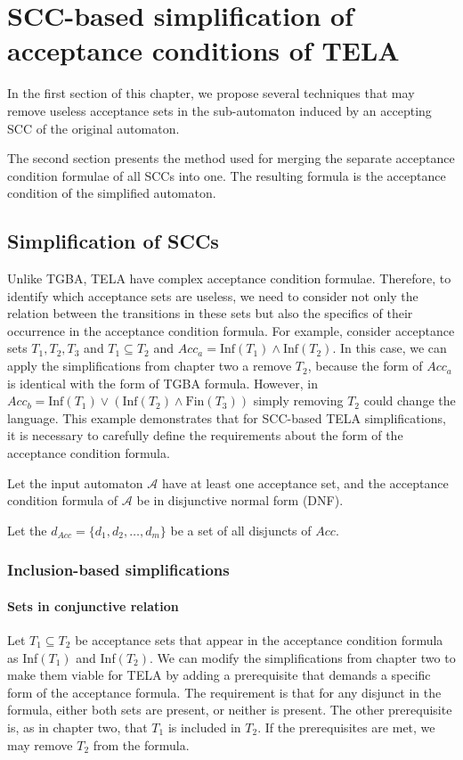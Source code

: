\documentclass[
  digital, %
  twoside, %
  table,   %
  lof,     %
  lot,     %
]{fithesis3}
\begin{document}
\chapter{SCC-based simplification of acceptance conditions of TELA}
In the first section of this chapter, we propose several techniques that may remove useless acceptance sets in the sub-automaton induced by an accepting SCC of the original automaton. 

The second section presents the method used for merging the separate acceptance condition formulae of all SCCs into one. The resulting formula is the acceptance condition of the simplified automaton.

\section{Simplification of SCCs}
Unlike TGBA, TELA have complex acceptance condition formulae. Therefore, to identify which acceptance sets are useless, we need to consider not only the relation between the transitions in these sets but also the specifics of their occurrence in the acceptance condition formula. For example, consider acceptance sets $T_1, T_2, T_3$ and $T_1 \subseteq T_2$ and $Acc_a = \text{Inf}(T_1) \wedge \text{Inf}(T_2)$. In this case, we can apply the simplifications from chapter two a remove $T_2$, because the form of $Acc_a$ is identical with the form of TGBA formula. However, in $Acc_b = \text{Inf}(T_1) \vee (\text{Inf}(T_2) \wedge \text{Fin}(T_3))$ simply removing $T_2$ could change the language. This example demonstrates that for SCC-based TELA simplifications, it is necessary to carefully define the requirements about the form of the acceptance condition formula.

Let the input automaton $\mathcal{A}$ have at least one acceptance set, and the acceptance condition formula of $\mathcal{A}$ be in disjunctive normal form (DNF). 

Let the $d_{Acc} = \{d_1, d_2, \dots, d_m\}$ be a set of all disjuncts of $Acc$.


\subsection{Inclusion-based simplifications}
\subsubsection{Sets in conjunctive relation}
Let $T_1 \subseteq T_2$ be acceptance sets that appear in the acceptance condition formula as Inf$(T_1)$ and Inf$(T_2)$. We can modify the simplifications from chapter two to make them viable for TELA by adding a prerequisite that demands a specific form of the acceptance formula. The requirement is that for any disjunct in the formula, either both sets are present, or neither is present. The other prerequisite is, as in chapter two, that $T_1$ is included in $T_2$. If the prerequisites are met, we may remove $T_2$ from the formula. 
\end{document}

